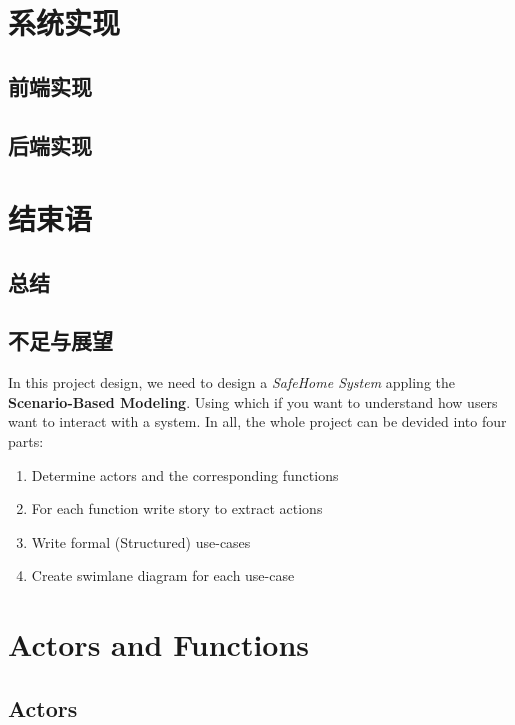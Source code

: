 \documentclass[twoside,11pt]{article}
\begin{document}
\section{系统实现}
\subsection{前端实现}
\subsection{后端实现}


\section{结束语}
\subsection{总结}
\subsection{不足与展望}




In this project design, we need to design a \emph{SafeHome System} appling the \textbf{Scenario-Based Modeling}. Using which if you want to understand how users want to interact with a system\cite{roger2015software}. In all, the whole project can be devided into four parts:
\begin{enumerate}
    \item Determine actors and the corresponding functions
    \item For each function write story to extract actions
    \item Write formal (Structured) use-cases
    \item Create swimlane diagram for each use-case
\end{enumerate}

\section{Actors and Functions}

\subsection{Actors}
\end{document}
